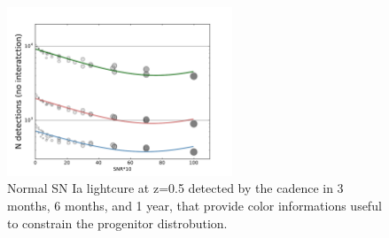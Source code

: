 \begin{figure}[hbt]
  \centerline{
    \includegraphics[width=0.6\textwidth]{figs/transients/LSST_Iadetected_wcolor.pdf}
  }
  \caption{
    Normal SN Ia lightcure at z=0.5 detected by the  cadence in 3 months, 6 months, and 1 year, that provide color informations useful to constrain the progenitor distrobution. }
  \label{fig:sndetect}
\end{figure}
